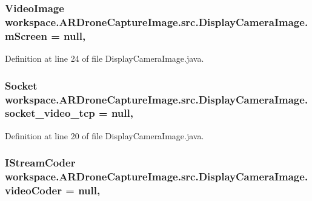 \subsubsection[{m\+Screen}]{\setlength{\rightskip}{0pt plus 5cm}Video\+Image workspace.\+A\+R\+Drone\+Capture\+Image.\+src.\+Display\+Camera\+Image.\+m\+Screen = null\hspace{0.3cm}{\ttfamily [static]}, {\ttfamily [private]}}\label{classworkspace_1_1_a_r_drone_capture_image_1_1src_1_1_display_camera_image_a0cef26d99006f123fc8ff67021768909}


Definition at line 24 of file Display\+Camera\+Image.\+java.

\hypertarget{classworkspace_1_1_a_r_drone_capture_image_1_1src_1_1_display_camera_image_a03bb3aa316596a78abdb6f7d6a7c14f8}{}
\subsubsection[{socket\+\_\+video\+\_\+tcp}]{\setlength{\rightskip}{0pt plus 5cm}Socket workspace.\+A\+R\+Drone\+Capture\+Image.\+src.\+Display\+Camera\+Image.\+socket\+\_\+video\+\_\+tcp = null\hspace{0.3cm}{\ttfamily [static]}, {\ttfamily [private]}}\label{classworkspace_1_1_a_r_drone_capture_image_1_1src_1_1_display_camera_image_a03bb3aa316596a78abdb6f7d6a7c14f8}


Definition at line 20 of file Display\+Camera\+Image.\+java.

\hypertarget{classworkspace_1_1_a_r_drone_capture_image_1_1src_1_1_display_camera_image_a13aa4bcc23766e6bac7e49ea7c882019}{}
\subsubsection[{video\+Coder}]{\setlength{\rightskip}{0pt plus 5cm}I\+Stream\+Coder workspace.\+A\+R\+Drone\+Capture\+Image.\+src.\+Display\+Camera\+Image.\+video\+Coder = null\hspace{0.3cm}{\ttfamily [static]}, {\ttfamily [private]}}\label{classworkspace_1_1_a_r_drone_capture_image_1_1src_1_1_display_camera_image_a13aa4bcc23766e6bac7e49ea7c882019}


